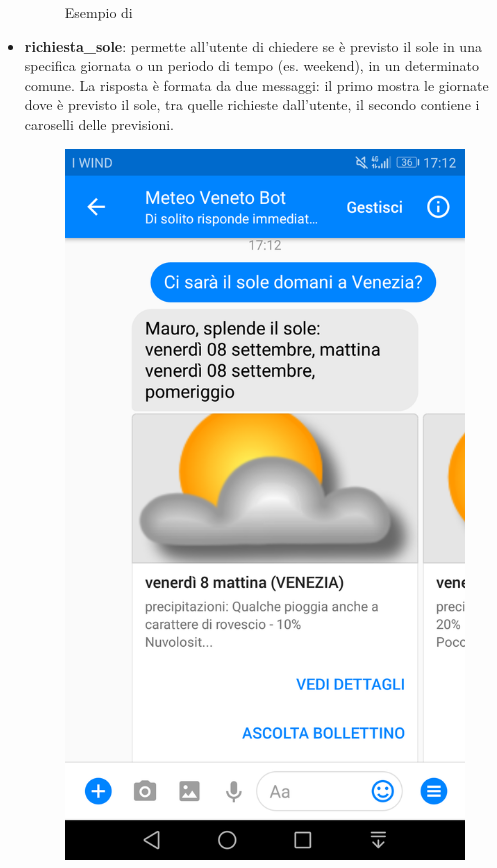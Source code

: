 \begin{itemize}
\begin{figure}[h!]
		\caption{Esempio di }
	\end{figure}	
	\item \textbf{richiesta\_sole}: permette all'utente di chiedere se è previsto il sole in una specifica giornata o un periodo di tempo (es. weekend), in un determinato comune. La risposta è formata da due messaggi: il primo mostra le giornate dove è previsto il sole, tra quelle richieste dall'utente, il secondo contiene i caroselli delle previsioni.
	\begin{figure}[h!]
		\centering
		\includegraphics[scale=0.12]{../Immagini/richiesta_sole.png}

\end{figure}
\end{itemize}
